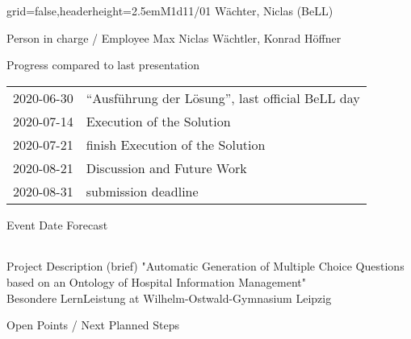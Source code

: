 \documentclass[english]{kiesgrube}
\begin{document}
\newpage

\begin{poster}{grid=false,headerheight=2.5em}{}{M1d11/01 Wächter, Niclas (BeLL)}{}{}
\begin{posterbox}[name=person,column=0,row=0]{Person in charge / Employee}
Max Niclas Wächtler, Konrad Höffner
\end{posterbox}
\begin{posterbox}[name=progress,below=person]{Progress compared to last presentation}
\begin{tabulary}{\textwidth}{lL}
2020-06-30	&\enquote{Ausführung der Lösung}, last official BeLL day\\
2020-07-14	&Execution of the Solution\\
2020-07-21	&finish Execution of the Solution\\
2020-08-21	&Discussion and Future Work\\
2020-08-31	&submission deadline\\
\end{tabulary}
\end{posterbox}
\begin{posterbox}[name=event,below=progress]{Event Date Forecast}
\begin{tabulary}{\textwidth}{lL}
\end{tabulary}
\end{posterbox}
\begin{posterbox}[name=description,column=1,row=0]{Project Description (brief)}
\small
"Automatic Generation of Multiple Choice Questions based on an Ontology of Hospital Information Management"\\
Besondere LernLeistung at Wilhelm-Ostwald-Gymnasium Leipzig
\end{posterbox}
\begin{posterbox}[name=open,column=1,below=description]{Open Points / Next Planned Steps}
\end{posterbox}

\end{poster}
\end{document}
